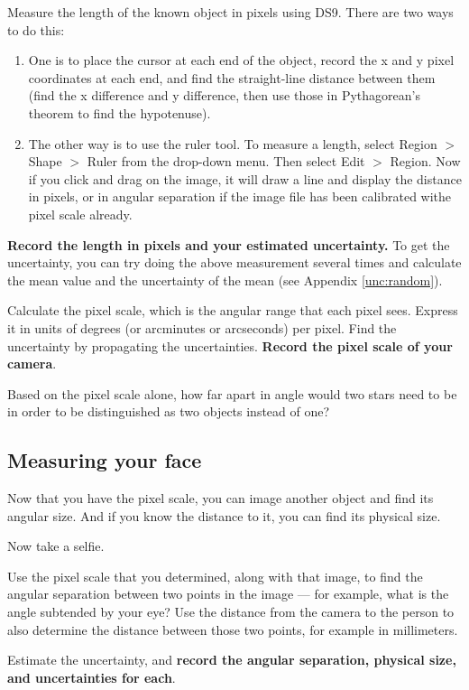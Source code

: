 \begin{steps}
	
	\item Measure the length of the known object in pixels using DS9. There are two ways to do this:
	\begin{enumerate}
		\item One is to place the cursor at each end of the object, record the x and y pixel coordinates at each end, and find the straight-line distance between them (find the x difference and y difference, then use those in Pythagorean's theorem to find the hypotenuse).
		
		\item The other way is to use the ruler tool. To measure a length, select Region $>$ Shape $>$ Ruler from the drop-down menu. Then select Edit $>$ Region. Now if you click and drag on the image, it will draw a line and display the distance in pixels, or in angular separation if the image file has been calibrated withe pixel scale already.
	\end{enumerate}
	
	\textbf{Record the length in pixels and your estimated uncertainty.} To get the uncertainty, you can try doing the above measurement several times and calculate the mean value and the uncertainty of the mean (see Appendix \ref{unc:random}). 
	
	\item Calculate the pixel scale, which is the angular range that each pixel sees. Express it in units of degrees (or arcminutes or arcseconds) per pixel. Find the uncertainty by propagating the uncertainties. \textbf{Record the pixel scale of your camera}.

	\item Based on the pixel scale alone, how far apart in angle would two stars need to be in order to be distinguished as two objects instead of one?

\end{steps}

\subsection{Measuring your face}

Now that you have the pixel scale, you can image another object and find its angular size. And if you know the distance to it, you can find its physical size.

\begin{steps}
	\item Now take a selfie.
	
	\item Use the pixel scale that you determined, along with that image, to find the angular separation between two points in the image --- for example, what is the angle subtended by your eye? Use the distance from the camera to the person to also determine the distance between those two points, for example in millimeters.
	
	\item Estimate the uncertainty, and \textbf{record the angular separation, physical size, and uncertainties for each}.
\end{steps}

